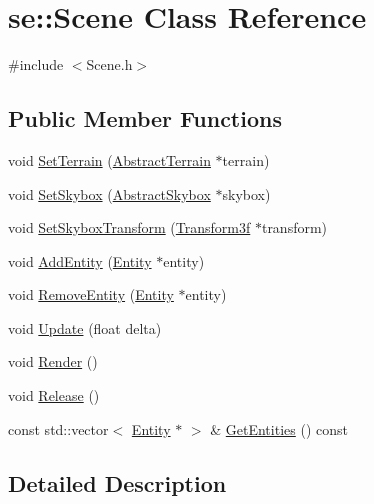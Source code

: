 \hypertarget{classse_1_1_scene}{}\section{se\+:\+:Scene Class Reference}
\label{classse_1_1_scene}


{\ttfamily \#include $<$Scene.\+h$>$}

\subsection*{Public Member Functions}
\begin{DoxyCompactItemize}
\item 
void \mbox{\hyperlink{classse_1_1_scene_ac8fddc56bc7f1385d640f24e75ea41d6}{Set\+Terrain}} (\mbox{\hyperlink{classse_1_1_abstract_terrain}{Abstract\+Terrain}} $\ast$terrain)
\item 
void \mbox{\hyperlink{classse_1_1_scene_a3e6547c6013dc83a23d6cc0f349955f0}{Set\+Skybox}} (\mbox{\hyperlink{classse_1_1_abstract_skybox}{Abstract\+Skybox}} $\ast$skybox)
\item 
void \mbox{\hyperlink{classse_1_1_scene_a75e3a3401c9d999f43baf01e89b16735}{Set\+Skybox\+Transform}} (\mbox{\hyperlink{classse_1_1_transform3f}{Transform3f}} $\ast$transform)
\item 
void \mbox{\hyperlink{classse_1_1_scene_a21dde7d731d672d4c424397850864549}{Add\+Entity}} (\mbox{\hyperlink{classse_1_1_entity}{Entity}} $\ast$entity)
\item 
void \mbox{\hyperlink{classse_1_1_scene_a5803cfd0f0dccf350f7a3fe478b3c834}{Remove\+Entity}} (\mbox{\hyperlink{classse_1_1_entity}{Entity}} $\ast$entity)
\item 
void \mbox{\hyperlink{classse_1_1_scene_acdc3858f5d4fd76cf9a712a02218341a}{Update}} (float delta)
\item 
void \mbox{\hyperlink{classse_1_1_scene_a6631ed2e0cc029636464dbaf76d55cbf}{Render}} ()
\item 
void \mbox{\hyperlink{classse_1_1_scene_a9ff2d989fc8a466b0a785f4fa4e446fe}{Release}} ()
\item 
const std\+::vector$<$ \mbox{\hyperlink{classse_1_1_entity}{Entity}} $\ast$ $>$ \& \mbox{\hyperlink{classse_1_1_scene_a1c3f1fc4ab110f9caab190cce13c2e03}{Get\+Entities}} () const
\end{DoxyCompactItemize}


\subsection{Detailed Description}


